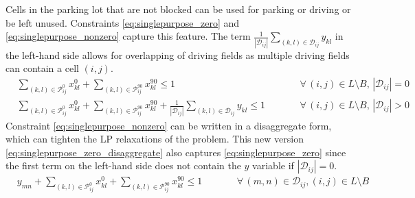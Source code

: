 \documentclass[10pt]{article}
\newcommand{\zeroparkvar}[2]{x^{0}_{#1#2}}
\newcommand{\ninetyparkvar}[2]{x^{90}_{#1#2}}
\newcommand{\drivevar}[2]{y_{#1#2}}
\newcommand{\lotset}{L}
\newcommand{\blockedset}{B}
\newcommand{\invzeroparkset}[2]{\mathcal{P}_{#1#2}^{0}}
\newcommand{\invninetyparkset}[2]{\mathcal{P}_{#1#2}^{90}}
\newcommand{\invdriveset}[2]{\mathcal{D}_{#1#2}}
\theoremstyle{definition}
\begin{document}
Cells in the parking lot that are not blocked can be used for parking or driving or be left unused. Constraints \eqref{eq:singlepurpose_zero} and \eqref{eq:singlepurpose_nonzero} capture this feature. The term $\frac{1}{|\invdriveset{i}{j}|} \sum_{(k,l) \in  \invdriveset{i}{j}} \drivevar{k}{l}$ in the left-hand side allows for overlapping of driving fields as multiple driving fields can contain a cell $(i,j)$.
\begin{align}
& \sum_{(k,l) \in \invzeroparkset{i}{j}} \zeroparkvar{k}{l} + \sum_{(k,l) \in \invninetyparkset{i}{j}} \ninetyparkvar{k}{l} \leq 1  \qquad && \forall\,  (i,j) \in \lotset \setminus \blockedset,\,|\invdriveset{i}{j}| = 0  \label{eq:singlepurpose_zero} \\
& \sum_{(k,l) \in \invzeroparkset{i}{j}} \zeroparkvar{k}{l} + \sum_{(k,l) \in \invninetyparkset{i}{j}} \ninetyparkvar{k}{l} + \frac{1}{|\invdriveset{i}{j}|} \sum_{(k,l) \in  \invdriveset{i}{j}} \drivevar{k}{l} \leq 1  \qquad && \forall\,  (i,j) \in \lotset \setminus \blockedset,\,|\invdriveset{i}{j}| > 0 \label{eq:singlepurpose_nonzero}
\end{align}
Constraint \eqref{eq:singlepurpose_nonzero} can be written in a disaggregate form, which can tighten the LP relaxations of the problem. This new version \eqref{eq:singlepurpose_zero_disaggregate} also captures \eqref{eq:singlepurpose_zero} since the first term on the left-hand side does not contain the $y$ variable if $|\invdriveset{i}{j}| = 0$.
\begin{align}
& \drivevar{m}{n} + \sum_{(k,l) \in \invzeroparkset{i}{j}} \zeroparkvar{k}{l} + \sum_{(k,l) \in \invninetyparkset{i}{j}} \ninetyparkvar{k}{l} \leq 1  \qquad && \forall\,  (m, n) \in  \invdriveset{i}{j}, (i,j) \in \lotset \setminus \blockedset \label{eq:singlepurpose_zero_disaggregate} 
\end{align}
\end{document}
